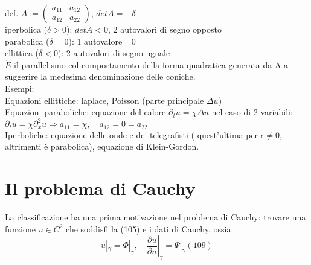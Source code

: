\documentclass[a4paper,11pt]{report}
\begin{document}
def. $ A:=\left(\begin{matrix}
a_{11} & a_{12}\\
a_{12} & a_{22}
\end{matrix}\right)
$, $det A=-\delta$\\
iperbolica ($\delta >0$): $detA<0$, 2 autovalori di segno opposto\\
parabolica ($\delta =0$): 1 autovalore  =0\\
ellittica ($\delta <0$): 2 autovalori di segno uguale\\
$\grave{E}$ il parallelismo col comportamento della forma quadratica generata da A a suggerire la medesima denominazione delle coniche. \\
Esempi:\\
Equazioni ellittiche: laplace, Poisson (parte principale $\Delta u$)\\
Equazioni paraboliche: equazione del calore $\partial_t u = \chi \Delta u$ nel caso di 2 variabili: $\partial_t u = \chi \partial_x^2 u \Rightarrow a_{11}=\chi, \quad a_{12}=0 = a_{22} $\\
Iperboliche: equazione delle onde e dei telegrafisti ( quest'ultima per $\epsilon \neq 0$, altrimenti è parabolica), equazione di Klein-Gordon.

\section{Il problema di Cauchy}
La classificazione ha una prima motivazione nel problema di Cauchy: trovare una funzione $u\in C^2$ che soddisfi la (105) e i dati di Cauchy, ossia:
\begin{equation}
u|_{\gamma}=\Phi|_{\gamma}, \quad \left.\dfrac{\partial u}{\partial n}\right|_{\gamma}=\left.\Psi\right|_{\gamma} (109)
\end{equation}
\end{document}
